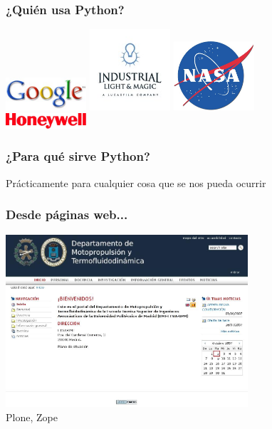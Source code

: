 \documentclass{beamer}
\begin{document}
\begin{frame}
 \frametitle{¿Quién usa Python?}

\begin{center}
 \includegraphics[width=3cm]{files/google.jpg}
 \includegraphics[width=3cm]{files/Industrial_Light_and_Magic.jpg}
 \includegraphics[width=3cm]{files/NASA_Logo.jpg}\\
 \includegraphics[width=3cm]{files/honeywell_logo.jpg}
\end{center}
\end{frame}

\begin{frame}
 \frametitle{¿Para qué sirve Python?}
 \begin{center}
 Prácticamente para cualquier cosa que se nos pueda ocurrir
 \end{center}

\end{frame}

\begin{frame}
 \frametitle{Desde páginas web...}
\begin{center}
 \includegraphics[width=9cm]{files/snapshot1.jpg}\\
Plone, Zope
\end{center}

\end{frame}
\end{document}
